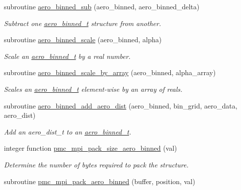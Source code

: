 \begin{DoxyCompactItemize}
subroutine \mbox{\hyperlink{namespacepmc__aero__binned_a951d4b411ac6e8389dff498a3fac4a75}{aero\+\_\+binned\+\_\+sub}} (aero\+\_\+binned, aero\+\_\+binned\+\_\+delta)
\begin{DoxyCompactList}\small\item\em Subtract one \mbox{\hyperlink{structpmc__aero__binned_1_1aero__binned__t}{aero\+\_\+binned\+\_\+t}} structure from another. \end{DoxyCompactList}\item 
subroutine \mbox{\hyperlink{namespacepmc__aero__binned_aaad30ea5e8fa124ae11804528f398bf0}{aero\+\_\+binned\+\_\+scale}} (aero\+\_\+binned, alpha)
\begin{DoxyCompactList}\small\item\em Scale an \mbox{\hyperlink{structpmc__aero__binned_1_1aero__binned__t}{aero\+\_\+binned\+\_\+t}} by a real number. \end{DoxyCompactList}\item 
subroutine \mbox{\hyperlink{namespacepmc__aero__binned_a6919807c13cf69e9475e0a025b11d246}{aero\+\_\+binned\+\_\+scale\+\_\+by\+\_\+array}} (aero\+\_\+binned, alpha\+\_\+array)
\begin{DoxyCompactList}\small\item\em Scales an \mbox{\hyperlink{structpmc__aero__binned_1_1aero__binned__t}{aero\+\_\+binned\+\_\+t}} element-\/wise by an array of reals. \end{DoxyCompactList}\item 
subroutine \mbox{\hyperlink{namespacepmc__aero__binned_a9de5c0ee7ae2e44a03b162692d83c1f7}{aero\+\_\+binned\+\_\+add\+\_\+aero\+\_\+dist}} (aero\+\_\+binned, bin\+\_\+grid, aero\+\_\+data, aero\+\_\+dist)
\begin{DoxyCompactList}\small\item\em Add an aero\+\_\+dist\+\_\+t to an \mbox{\hyperlink{structpmc__aero__binned_1_1aero__binned__t}{aero\+\_\+binned\+\_\+t}}. \end{DoxyCompactList}\item 
integer function \mbox{\hyperlink{namespacepmc__aero__binned_a176eeff6d4f514d3e2021821bcaa166e}{pmc\+\_\+mpi\+\_\+pack\+\_\+size\+\_\+aero\+\_\+binned}} (val)
\begin{DoxyCompactList}\small\item\em Determine the number of bytes required to pack the structure. \end{DoxyCompactList}\item 
subroutine \mbox{\hyperlink{namespacepmc__aero__binned_a9c4ceab5200a5fafdc12aba7197b2b6c}{pmc\+\_\+mpi\+\_\+pack\+\_\+aero\+\_\+binned}} (buffer, position, val)

\end{DoxyCompactItemize}
